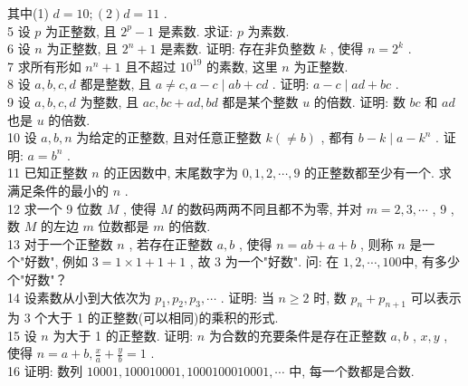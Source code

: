 其中(1) $d=10 ;  ( 2 ) d=11$ . \\
5 设 $p$ 为正整数, 且 $2^{p}-1$ 是素数. 求证:  $p$ 为素数. \\
6 设 $n$ 为正整数, 且 $2^{n}+1$ 是素数. 证明: 存在非负整数 $k$ , 使得 $n=2^{k}$ . \\
7 求所有形如 $n^{n}+1$ 且不超过 $10^{19}$ 的素数, 这里 $n$ 为正整数. \\
8 设 $a ,  b ,  c ,  d$ 都是整数, 且 $a \neq c, a-c \mid a b+c d$ . 证明:  $a-c \mid a d+b c$ . \\
9 设 $a ,  b ,  c ,  d$ 为整数, 且 $a c ,  b c+a d ,  b d$ 都是某个整数 $u$ 的倍数. 证明: 数 $b c$ 和 $a d$ 也是 $u$ 的倍数. \\
10 设 $a ,  b ,  n$ 为给定的正整数, 且对任意正整数 $k(\neq b)$ , 都有 $b-k \mid a-k^{n}$ . 证明: $a=b^{n}$ . \\
11 已知正整数 $n$ 的正因数中, 末尾数字为 $0,1,2, \cdots, 9$ 的正整数都至少有一个. 求满足条件的最小的 $n$ . \\
12 求一个 9 位数 $M$ , 使得 $M$ 的数码两两不同且都不为零, 并对 $m=2,3, \cdots$ ,  9 , 数 $M$ 的左边 $m$ 位数都是 $m$ 的倍数. \\
13 对于一个正整数 $n$ , 若存在正整数 $a ,  b$ , 使得 $n=a b+a+b$ , 则称 $n$ 是一个"好数", 例如 $3=1 \times 1+1+1$ , 故 3 为一个"好数". 问: 在 $1,2, \cdots, 100$中, 有多少个"好数"？\\
14 设素数从小到大依次为 $p_{1}, p_{2}, p_{3}, \cdots$ . 证明: 当 $n \geqslant 2$ 时, 数 $p_{n}+p_{n+1}$ 可以表示为 3 个大于 1 的正整数(可以相同)的乘积的形式. \\
15 设 $n$ 为大于 1 的正整数. 证明:  $n$ 为合数的充要条件是存在正整数 $a ,  b$ ,  $x ,  y$ , 使得 $n=a+b, \frac{x}{a}+\frac{y}{b}=1$ . \\
16 证明: 数列 $10001,100010001,1000100010001, \cdots$ 中, 每一个数都是合数.

